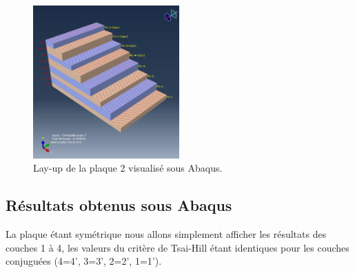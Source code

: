 \documentclass[a4paper,12pt]{article}
\begin{document}
\begin{figure}[h!]
	\centering
	\includegraphics[width=0.5\textwidth]{media/K_P2_layout_12042025.png} %
	\caption{Lay-up de la plaque 2 visualisé sous Abaqus.}
	\label{fig:exemple_image}
\end{figure}

\subsection{Résultats obtenus sous Abaqus}

La plaque étant symétrique nous allons simplement afficher les résultats des couches 1 à 4, les valeurs du critère de Tsai-Hill étant identiques pour les couches conjuguées (4=4', 3=3', 2=2', 1=1').
\end{document}
